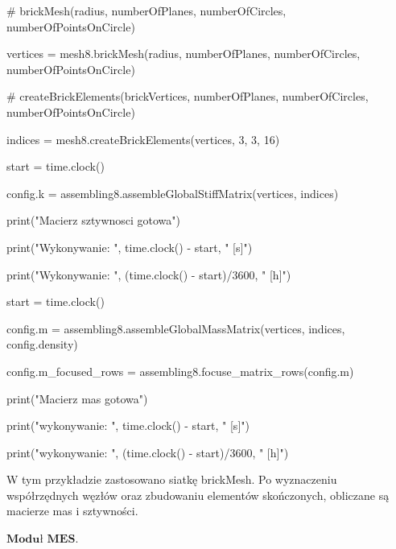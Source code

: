 \vspace {3mm}
    \# brickMesh(radius, numberOfPlanes, numberOfCircles, numberOfPointsOnCircle)

    vertices = mesh8.brickMesh(radius, numberOfPlanes, numberOfCircles, numberOfPointsOnCircle)

    \# createBrickElements(brickVertices, numberOfPlanes, numberOfCircles, numberOfPointsOnCircle)

    indices = mesh8.createBrickElements(vertices, 3, 3, 16)

\vspace {3mm}
    start = time.clock()

    config.k = assembling8.assembleGlobalStiffMatrix(vertices, indices)

    print("Macierz sztywnosci gotowa")

    print("Wykonywanie: ", time.clock() - start, " [s]")

    print("Wykonywanie: ", (time.clock() - start)/3600, " [h]")

    start = time.clock()

\vspace {3mm}
    config.m = assembling8.assembleGlobalMassMatrix(vertices, indices, config.density)

    config.m\_focused\_rows = assembling8.focuse\_matrix\_rows(config.m)

    print("Macierz mas gotowa")

    print("wykonywanie: ", time.clock() - start, " [s]")

    print("wykonywanie: ", (time.clock() - start)/3600, " [h]")

\vspace {3mm}
W tym przykładzie zastosowano siatkę brickMesh. Po wyznaczeniu współrzędnych węzłów oraz zbudowaniu elementów skończonych, obliczane są macierze mas i sztywności.

 \( \textbf{Moduł MES} \).